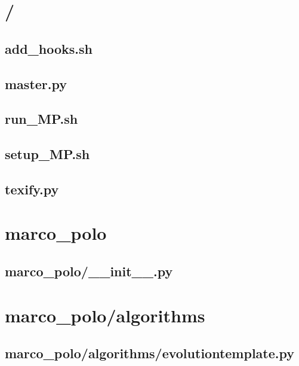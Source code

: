 \documentclass{article}
\begin{document}
\tableofcontents
\newpage
\section{/}
\subsection[add\_hooks.sh]{add\_hooks.sh}

\newpage

\subsection[master.py]{master.py}

\newpage

\subsection[run\_MP.sh]{run\_MP.sh}

\newpage

\subsection[setup\_MP.sh]{setup\_MP.sh}

\newpage

\subsection[texify.py]{texify.py}

\newpage

\section{marco\_polo}
\subsection[\_\_init\_\_.py]{marco\_polo/\_\_init\_\_.py}

\newpage

\section{marco\_polo/algorithms}
\subsection[evolutiontemplate.py]{marco\_polo/algorithms/evolutiontemplate.py}

\newpage
\end{document}
